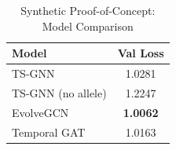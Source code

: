 \begin{table}[htbp]
\centering
\caption{Synthetic Proof-of-Concept: Model Comparison}
\label{tab:synthetic_proof}
\begin{tabular}{lc}
\toprule
\textbf{Model} & \textbf{Val Loss} \\
\midrule
  TS-GNN & 1.0281 \\
  TS-GNN (no allele) & 1.2247 \\
  EvolveGCN & \textbf{1.0062} \\
  Temporal GAT & 1.0163 \\
\bottomrule
\end{tabular}
\end{table}